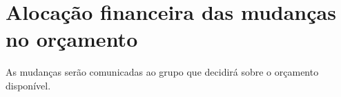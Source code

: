 

\section*{Alocação financeira das mudanças no orçamento}

As mudanças serão comunicadas ao grupo que decidirá sobre o orçamento disponível.

